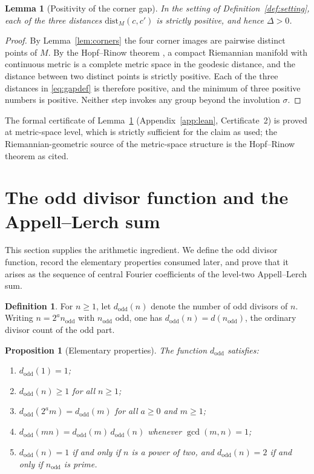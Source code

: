 \documentclass[11pt,a4paper]{article}
\newcommand{\dodd}{d_{\mathrm{odd}}}
\newcommand{\dist}{\mathrm{dist}}
\theoremstyle{plain}
\newtheorem{lemma}[theorem]{Lemma}
\newtheorem{proposition}[theorem]{Proposition}
\theoremstyle{definition}
\newtheorem{definition}[theorem]{Definition}
\theoremstyle{remark}
\begin{document}
\begin{lemma}[Positivity of the corner gap]\label{lem:positivity}
In the setting of Definition~\ref{def:setting}, each of the three distances $\dist_M(c, c')$ is strictly positive, and hence $\Delta > 0$.
\end{lemma}

\begin{proof}
By Lemma~\ref{lem:corners} the four corner images are pairwise distinct points of $M$. By the Hopf--Rinow theorem \cite[Ch.~7]{doCarmo}, a compact Riemannian manifold with continuous metric is a complete metric space in the geodesic distance, and the distance between two distinct points is strictly positive. Each of the three distances in \eqref{eq:gapdef} is therefore positive, and the minimum of three positive numbers is positive. Neither step invokes any group beyond the involution $\sigma$.
\end{proof}

The formal certificate of Lemma~\ref{lem:positivity} (Appendix~\ref{app:lean}, Certificate~2) is proved at metric-space level, which is strictly sufficient for the claim as used; the Riemannian-geometric source of the metric-space structure is the Hopf--Rinow theorem as cited.

\section{The odd divisor function and the Appell--Lerch sum}\label{sec:arithmetic}

This section supplies the arithmetic ingredient. We define the odd divisor function, record the elementary properties consumed later, and prove that it arises as the sequence of central Fourier coefficients of the level-two Appell--Lerch sum.

\begin{definition}\label{def:dodd}
For $n \ge 1$, let $\dodd(n)$ denote the number of odd divisors of $n$. Writing $n = 2^a n_{\mathrm{odd}}$ with $n_{\mathrm{odd}}$ odd, one has $\dodd(n) = d(n_{\mathrm{odd}})$, the ordinary divisor count of the odd part.
\end{definition}

\begin{proposition}[Elementary properties]\label{prop:doddprops}
The function $\dodd$ satisfies:
\begin{enumerate}[label=\textup{(\roman*)}]
\item $\dodd(1) = 1$;
\item $\dodd(n) \ge 1$ for all $n \ge 1$;
\item $\dodd(2^a m) = \dodd(m)$ for all $a \ge 0$ and $m \ge 1$;
\item $\dodd(mn) = \dodd(m)\,\dodd(n)$ whenever $\gcd(m,n) = 1$;
\item $\dodd(n) = 1$ if and only if $n$ is a power of two, and
$\dodd(n) = 2$ if and only if $n_{\mathrm{odd}}$ is prime.
\end{enumerate}
\end{proposition}
\end{document}
